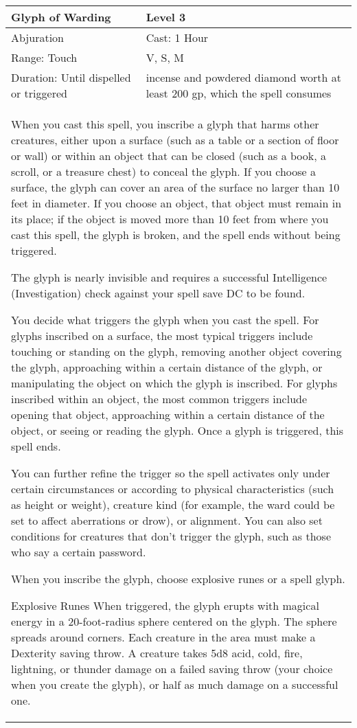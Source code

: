 \documentclass[11pt]{report}
\begin{document}
\begin{table}[H]
	\begin{tabular}{||p{6cm}|p{6cm}||}
		\hline\hline
		\bf{Glyph of Warding} & Level 3\\ \hline
		Abjuration & Cast: 1 Hour\\ \hline
		Range: Touch & V, S, M\\ \hline
		Duration: Until dispelled or triggered & incense and powdered diamond worth at least 200 gp, which the spell consumes\\ \hline
		\multicolumn{2}{||p{12cm}||}{When you cast this spell, you inscribe a glyph that harms other creatures, either upon a surface (such as a table or a section of floor or wall) or within an object that can be closed (such as a book, a scroll, or a treasure chest) to conceal the glyph.
If you choose a surface, the glyph can cover an area of the surface no larger than 10 feet in diameter. If you choose an object, that object must remain in its place; if the object is moved more than 10 feet from where you cast this spell, the glyph is broken, and the spell ends without being triggered.

The glyph is nearly invisible and requires a successful Intelligence (Investigation) check against your spell save DC to be found.

You decide what triggers the glyph when you cast the spell. For glyphs inscribed on a surface, the most typical triggers include touching or standing on the glyph, removing another object covering the glyph, approaching within a certain distance of the glyph, or manipulating the object on which the glyph is inscribed. For glyphs inscribed within an object, the most common triggers include opening that object, approaching within a certain distance of the object, or seeing or reading the glyph. Once a glyph is triggered, this spell ends.

You can further refine the trigger so the spell activates only under certain circumstances or according to physical characteristics (such as height or weight), creature kind (for example, the ward could be set to affect aberrations or drow), or alignment. You can also set conditions for creatures that don’t trigger the glyph, such as those who say a certain password.

When you inscribe the glyph, choose explosive runes or a spell glyph.

Explosive Runes
When triggered, the glyph erupts with magical energy in a 20-foot-radius sphere centered on the glyph. The sphere spreads around corners. Each creature in the area must make a Dexterity saving throw. A creature takes 5d8 acid, cold, fire, lightning, or thunder damage on a failed saving throw (your choice when you create the glyph), or half as much damage on a successful one.

}
\end{tabular}
\end{table}
\end{document}
